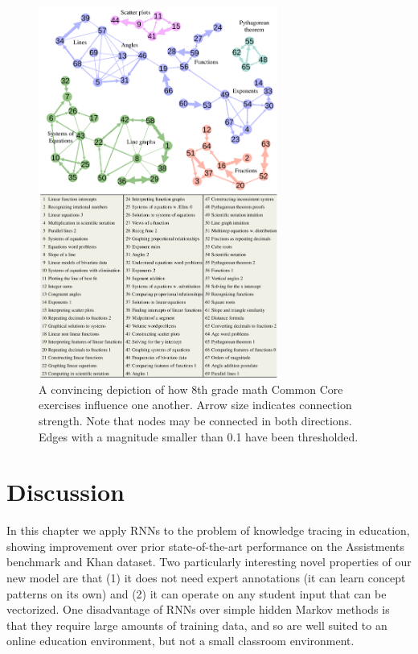 \begin{figure}[!h]
\centering
\includegraphics[width=0.7\textwidth]{img/conceptClusters_khan}
\caption[Conditional influences Khan]{A convincing depiction of how 8th grade math Common Core exercises influence one another.
Arrow size indicates connection strength. Note that nodes may be connected in both directions. Edges with a magnitude smaller than 0.1 have been thresholded. 
\label{fig:conceptClusters}
}

\end{figure}


\section{Discussion}

In this chapter we apply RNNs to the problem of knowledge tracing in education, showing improvement over prior state-of-the-art performance on the Assistments benchmark and Khan dataset.
Two particularly interesting novel properties of our new model are that (1) it does not need expert annotations (it can learn concept patterns on its own) and (2) it can operate on any student input that can be vectorized. One disadvantage of RNNs over simple hidden Markov methods is that they require large amounts of training data, and so are well suited to an online education environment, but not a small classroom environment. 

